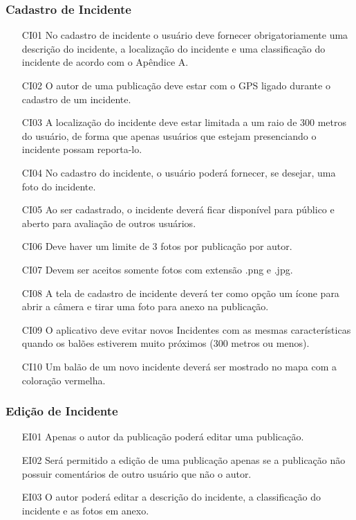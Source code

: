 \documentclass[12pt]{article}
\begin{document}
\subsubsection{Cadastro de Incidente}
\begin{enumerate}
    \item [CI01] No cadastro de incidente o usuário deve fornecer obrigatoriamente uma descrição do incidente, a localização do incidente e uma classificação do incidente de acordo com o Apêndice A.
    \item [CI02] O autor de uma publicação deve estar com o GPS ligado durante o cadastro de um incidente.
    \item [CI03] A localização do incidente deve estar limitada a um raio de 300 metros do usuário, de forma que apenas usuários que estejam presenciando o incidente possam reporta-lo.
    \item [CI04] No cadastro do incidente, o usuário poderá fornecer, se desejar, uma foto do incidente.
    \item [CI05] Ao ser cadastrado, o incidente deverá ficar disponível para público e aberto para avaliação de outros usuários.
    \item [CI06] Deve haver um limite de 3 fotos por publicação por autor.
    \item [CI07] Devem ser aceitos somente fotos com extensão .png e .jpg.
    \item [CI08] A tela de cadastro de incidente deverá ter como opção um ícone para abrir a câmera e tirar uma foto para anexo na publicação.
    \item [CI09] O aplicativo deve evitar novos Incidentes com as mesmas características quando os balões estiverem muito próximos (300 metros ou menos).%
    \item [CI10] Um balão de um novo incidente deverá ser mostrado no mapa com a coloração vermelha.
\end{enumerate}
\subsubsection{Edição de Incidente}
\begin{enumerate}
    \item [EI01] Apenas o autor da publicação poderá editar uma publicação.
    \item [EI02] Será permitido a edição de uma publicação apenas se a publicação não possuir comentários de outro usuário que não o autor.
    \item [EI03] O autor poderá editar a descrição do incidente, a classificação do incidente e as fotos em anexo. 
\end{enumerate}
\end{document}
